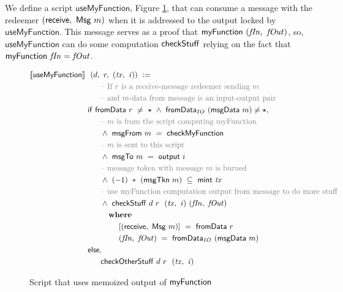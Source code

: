 We define a script $\mathsf{useMyFunction}$, Figure \ref{fig:usemf}, that can
consume a message with the redeemer $(\mathsf{receive},~\mathsf{Msg}~m)$
when it is addressed to the output locked by $\mathsf{useMyFunction}$.
This message serves as a proof that $\mathsf{myFunction}~(\mathit{fIn},~\mathit{fOut})$,
so, $\mathsf{useMyFunction}$ can do some
computation $\mathsf{checkStuff}$ relying on the fact that $\mathsf{myFunction}~\mathit{fIn} = \mathit{fOut}$.

\begin{figure}[htb]
  \begin{align*}
    \applyScript{\mathsf{useMyFunction}}~&~(d,~r,~(\var{tx},~\var{i}))~\leteq~\\
    &~~~~~\text{\textcolor{gray}{-- If $r$ is a receive-message redeemer sending $m$}} \\
    &~~~~~\text{\textcolor{gray}{-- and $m$-data from message is an input-output pair}} \\
    & \fun{if }~\fun{fromData}~r~\neq~\emptytype~ \wedge ~\fun{fromData}_{IO}~(\fun{msgData}~m) \neq \emptytype,~\\
    &~~~~~\text{\textcolor{gray}{-- $m$ is from the script computing myFunction}} \\
    &~~~~~\wedge~ \fun{msgFrom}~m~=~\mathsf{checkMyFunction} \\
    &~~~~~\text{\textcolor{gray}{-- $m$ is sent to this script}} \\
    &~~~~~\wedge~ \fun{msgTo}~m~=~\fun{output}~i \\
    &~~~~~\text{\textcolor{gray}{-- message token with message $m$ is burned}} \\
    &~~~~~\wedge~(-1)~*~(\msgTkn~m)~\subseteq~\mint~\var{tx} \\
    &~~~~~\text{\textcolor{gray}{-- use myFunction computation output from message to do more stuff}} \\
    &~~~~~\wedge~\fun{checkStuff}~d~r~~(\var{tx},~\var{i})~(\var{fIn},~\var{fOut}) \\
    &~~~~~~\where \\
    &~~~~~~~~~~~ ~[(\receive,~\Msg~m)] ~=~\fun{fromData}~r \\
    &~~~~~~~~~~~ ~(\var{fIn},~\var{fOut}) ~=~\fun{fromData}_{IO}~(\fun{msgData}~m) \\
    & \fun{else, } \\
    &~~~~~\fun{checkOtherStuff}~d~r~~(\var{tx},~\var{i})
  \end{align*}
\caption{Script that uses memoized output of $\mathsf{myFunction}$}
\label{fig:usemf}
\end{figure}

